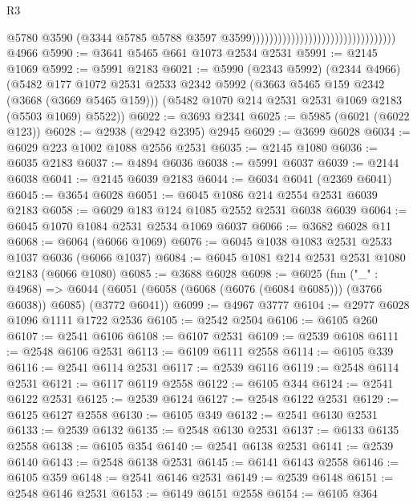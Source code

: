 \begin{lexlean}{R3}
\begin{coremodule}
                                                                    @5780
                                                                    @3590
                                                                    (@3344
                                                                      @5785
                                                                      @5788
                                                                      @3597
                                                                      @3599)))))))))))))))))))))))))))))))))
    @4966
@5990 := @3641 @5465 @661 @1073 @2534 @2531
@5991 := @2145 @1069
@5992 := @5991 @2183
@6021 := @5990
    (@2343 @5992)
    (@2344 @4966)
    (@5482
      @177
      @1072
      @2531
      @2533
      @2342
      @5992
      (@3663 @5465 @159 @2342 (@3668 (@3669 @5465 @159)))
      (@5482 @1070 @214 @2531 @2531 @1069 @2183 (@5503 @1069) @5522))
@6022 := @3693 @2341
@6025 := @5985 (@6021 (@6022 @123))
@6028 := @2938 (@2942 @2395) @2945
@6029 := @3699 @6028
@6034 := @6029 @223 @1002 @1088 @2556 @2531
@6035 := @2145 @1080
@6036 := @6035 @2183
@6037 := @4894 @6036
@6038 := @5991 @6037
@6039 := @2144 @6038
@6041 := @2145 @6039 @2183
@6044 := @6034 @6041 (@2369 @6041)
@6045 := @3654 @6028
@6051 := @6045 @1086 @214 @2554 @2531 @6039 @2183
@6058 := @6029 @183 @124 @1085 @2552 @2531 @6038 @6039
@6064 := @6045 @1070 @1084 @2531 @2534 @1069 @6037
@6066 := @3682 @6028 @11
@6068 := @6064 (@6066 @1069)
@6076 := @6045 @1038 @1083 @2531 @2533 @1037 @6036 (@6066 @1037)
@6084 := @6045 @1081 @214 @2531 @2531 @1080 @2183 (@6066 @1080)
@6085 := @3688 @6028
@6098 := @6025
    (fun ("_" : @4968) =>
    @6044 (@6051 (@6058 (@6068 (@6076 (@6084 @6085))) (@3766 @6038)) @6085) (@3772 @6041))
@6099 := @4967 @3777
@6104 := @2977 @6028 @1096 @1111 @1722 @2536
@6105 := @2542 @2504
@6106 := @6105 @260
@6107 := @2541 @6106
@6108 := @6107 @2531
@6109 := @2539 @6108
@6111 := @2548 @6106 @2531
@6113 := @6109 @6111 @2558
@6114 := @6105 @339
@6116 := @2541 @6114 @2531
@6117 := @2539 @6116
@6119 := @2548 @6114 @2531
@6121 := @6117 @6119 @2558
@6122 := @6105 @344
@6124 := @2541 @6122 @2531
@6125 := @2539 @6124
@6127 := @2548 @6122 @2531
@6129 := @6125 @6127 @2558
@6130 := @6105 @349
@6132 := @2541 @6130 @2531
@6133 := @2539 @6132
@6135 := @2548 @6130 @2531
@6137 := @6133 @6135 @2558
@6138 := @6105 @354
@6140 := @2541 @6138 @2531
@6141 := @2539 @6140
@6143 := @2548 @6138 @2531
@6145 := @6141 @6143 @2558
@6146 := @6105 @359
@6148 := @2541 @6146 @2531
@6149 := @2539 @6148
@6151 := @2548 @6146 @2531
@6153 := @6149 @6151 @2558
@6154 := @6105 @364

\end{coremodule}
\end{lexlean}
